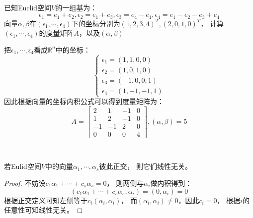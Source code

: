 ~

\begin{exercise}[度量矩阵]
  已知Euclid空间$V$的一组基为：
  \begin{equation*}
    \epsilon_1 = e_1 + e_2, \epsilon_2 = e_1 + e_3, \epsilon_3 = e_4 - e_1,\epsilon_4 = e_1 - e_2 - e_3 + e_4
  \end{equation*}
  向量$\alpha,\beta$在$(\epsilon_1,\cdots,\epsilon_4)$下的坐标分别为$(1,2,3,4)^T,(2,0,1,0)^T$，
  计算$(\epsilon_1,\cdots,\epsilon_4)$的度量矩阵$A$，以及$(\alpha,\beta)$
\end{exercise}

\begin{solution}
  把$\epsilon_1,\cdots,\epsilon_4$看成$\mathbb{R}^n$中的坐标：
  \begin{equation*}
    \begin{cases}
      \epsilon_1 = (1,1,0,0)\\
      \epsilon_2 = (1,0,1,0)\\
      \epsilon_3 = (-1,0,0,1)\\
      \epsilon_4 = (1,-1,-1,1)
    \end{cases}
  \end{equation*}
  因此根据向量的坐标内积公式可以得到度量矩阵为：
  \begin{equation*}
    A = \left[
      \begin{array}{cccc}
        2&1&-1&0 \\
         1&2&-1&0 \\
         -1&-1&2&0 \\
         0&0&0&4
      \end{array}
    \right], (\alpha,\beta) = 5
  \end{equation*}
\end{solution}

~

\begin{theorem}[正交向量线性无关]
  若Eulid空间$V$中的向量$\alpha_1,\cdots,\alpha_s$彼此正交，
  则它们线性无关。
\end{theorem}

\begin{proof}
  不妨设$c_1\alpha_1 + \cdots + c_s \alpha_s = 0$，
  则两侧与$\alpha_i$做内积得到：
  \begin{equation*}
    (c_1 \alpha_1 + \cdots + c_s \alpha_s, \alpha_i) = (0,\alpha_i) = 0
  \end{equation*}
  根据正交定义可知左侧等于$c_i(\alpha_i,\alpha_i)$，
  而$(\alpha_i,\alpha_i) \neq 0$，因此$c_i = 0$，
  根据$i$的任意性可知线性无关。
\end{proof}



